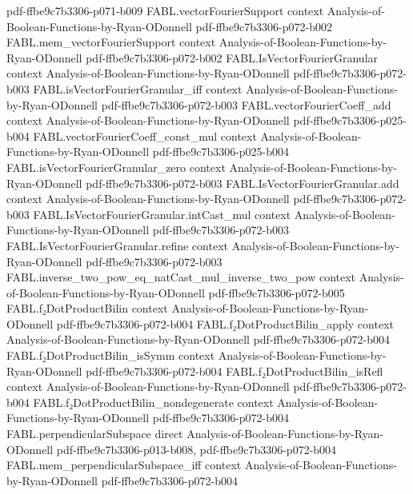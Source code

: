 \begin{theorem}
{    pdf-ffbe9c7b3306-p071-b009}
\proofstep
  {FABL.vectorFourierSupport}
  {context}
  {Analysis-of-Boolean-Functions-by-Ryan-ODonnell}
  {pdf-ffbe9c7b3306-p072-b002}
\proofstep
  {FABL.mem_vectorFourierSupport}
  {context}
  {Analysis-of-Boolean-Functions-by-Ryan-ODonnell}
  {pdf-ffbe9c7b3306-p072-b002}
\proofstep
  {FABL.IsVectorFourierGranular}
  {context}
  {Analysis-of-Boolean-Functions-by-Ryan-ODonnell}
  {pdf-ffbe9c7b3306-p072-b003}
\proofstep
  {FABL.isVectorFourierGranular_iff}
  {context}
  {Analysis-of-Boolean-Functions-by-Ryan-ODonnell}
  {pdf-ffbe9c7b3306-p072-b003}
\proofstep
  {FABL.vectorFourierCoeff_add}
  {context}
  {Analysis-of-Boolean-Functions-by-Ryan-ODonnell}
  {pdf-ffbe9c7b3306-p025-b004}
\proofstep
  {FABL.vectorFourierCoeff_const_mul}
  {context}
  {Analysis-of-Boolean-Functions-by-Ryan-ODonnell}
  {pdf-ffbe9c7b3306-p025-b004}
\proofstep
  {FABL.isVectorFourierGranular_zero}
  {context}
  {Analysis-of-Boolean-Functions-by-Ryan-ODonnell}
  {pdf-ffbe9c7b3306-p072-b003}
\proofstep
  {FABL.IsVectorFourierGranular.add}
  {context}
  {Analysis-of-Boolean-Functions-by-Ryan-ODonnell}
  {pdf-ffbe9c7b3306-p072-b003}
\proofstep
  {FABL.IsVectorFourierGranular.intCast_mul}
  {context}
  {Analysis-of-Boolean-Functions-by-Ryan-ODonnell}
  {pdf-ffbe9c7b3306-p072-b003}
\proofstep
  {FABL.IsVectorFourierGranular.refine}
  {context}
  {Analysis-of-Boolean-Functions-by-Ryan-ODonnell}
  {pdf-ffbe9c7b3306-p072-b003}
\proofstep
  {FABL.inverse_two_pow_eq_natCast_mul_inverse_two_pow}
  {context}
  {Analysis-of-Boolean-Functions-by-Ryan-ODonnell}
  {pdf-ffbe9c7b3306-p072-b005}
\proofstep
  {FABL.f₂DotProductBilin}
  {context}
  {Analysis-of-Boolean-Functions-by-Ryan-ODonnell}
  {pdf-ffbe9c7b3306-p072-b004}
\proofstep
  {FABL.f₂DotProductBilin_apply}
  {context}
  {Analysis-of-Boolean-Functions-by-Ryan-ODonnell}
  {pdf-ffbe9c7b3306-p072-b004}
\proofstep
  {FABL.f₂DotProductBilin_isSymm}
  {context}
  {Analysis-of-Boolean-Functions-by-Ryan-ODonnell}
  {pdf-ffbe9c7b3306-p072-b004}
\proofstep
  {FABL.f₂DotProductBilin_isRefl}
  {context}
  {Analysis-of-Boolean-Functions-by-Ryan-ODonnell}
  {pdf-ffbe9c7b3306-p072-b004}
\proofstep
  {FABL.f₂DotProductBilin_nondegenerate}
  {context}
  {Analysis-of-Boolean-Functions-by-Ryan-ODonnell}
  {pdf-ffbe9c7b3306-p072-b004}
\proofstep
  {FABL.perpendicularSubspace}
  {direct}
  {Analysis-of-Boolean-Functions-by-Ryan-ODonnell}
  {pdf-ffbe9c7b3306-p013-b008,
    pdf-ffbe9c7b3306-p072-b004}
\proofstep
  {FABL.mem_perpendicularSubspace_iff}
  {context}
  {Analysis-of-Boolean-Functions-by-Ryan-ODonnell}
  {pdf-ffbe9c7b3306-p072-b004}

\end{theorem}
